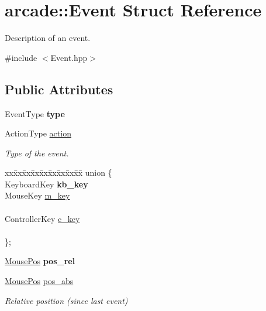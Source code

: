 \hypertarget{structarcade_1_1Event}{}\section{arcade\+:\+:Event Struct Reference}
\label{structarcade_1_1Event}


Description of an event.  




{\ttfamily \#include $<$Event.\+hpp$>$}

\subsection*{Public Attributes}
\begin{DoxyCompactItemize}
\item 
\mbox{\label{structarcade_1_1Event_a6e626bbe20fac99017e390ea0239b9a6}} 
Event\+Type {\bfseries type}
\item 
\mbox{\label{structarcade_1_1Event_a4c0d22bb440a9185fe94b9a66759823c}} 
Action\+Type \hyperlink{structarcade_1_1Event_a4c0d22bb440a9185fe94b9a66759823c}{action}
\begin{DoxyCompactList}\small\item\em Type of the event. \end{DoxyCompactList}\item 
\mbox{\label{structarcade_1_1Event_af864997eac4cf0e7682faf13930fdcda}} 
\begin{tabbing}
xx\=xx\=xx\=xx\=xx\=xx\=xx\=xx\=xx\=\kill
union \{\\
\>KeyboardKey {\bfseries kb\_key}\\
\>MouseKey \hyperlink{structarcade_1_1Event_a52ed03f8b18613ade5ce903d36762f32}{m\_key}\\
\>\\
\>ControllerKey \hyperlink{structarcade_1_1Event_a9d837c85701594ddda4d04dc5b1d8a39}{c\_key}\\
\>\\
\}; \\

\end{tabbing}\item 
\mbox{\label{structarcade_1_1Event_aa2b15c031d585e6ea86952bb579ca8ef}} 
\hyperlink{structarcade_1_1MousePos}{Mouse\+Pos} {\bfseries pos\+\_\+rel}
\item 
\mbox{\label{structarcade_1_1Event_a6fd21ebc551b688a77061cd44b01d425}} 
\hyperlink{structarcade_1_1MousePos}{Mouse\+Pos} \hyperlink{structarcade_1_1Event_a6fd21ebc551b688a77061cd44b01d425}{pos\+\_\+abs}
\begin{DoxyCompactList}\small\item\em Relative position (since last event) \end{DoxyCompactList}\end{DoxyCompactItemize}


